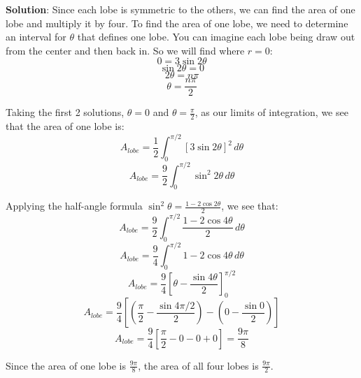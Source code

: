 \textbf{Solution}: Since each lobe is symmetric to the others, we can find the 
area of one lobe and multiply it by four. To find the area of one lobe, we 
need to determine an interval for $\theta$ that defines one lobe. You can 
imagine each lobe being draw out from the center and then back in. So we will 
find where $r = 0$:
$$0 = 3\sin{2\theta}$$
$$\sin{2\theta} = 0$$
$$2\theta = n\pi$$
$$\theta = \frac{n\pi}{2}$$

Taking the first 2 solutions, $\theta = 0$ and $\theta = \frac{\pi}{2}$, as our 
limits of integration, we see that the area of one lobe is:
$$A_{lobe} = \frac{1}{2} \int_0^{\pi/2} \left[3 \sin{2 \theta} \right]^2\,d
\theta$$
$$A_{lobe} = \frac{9}{2} \int_0^{\pi/2} \sin^2{2\theta}\,d\theta$$

Applying the half-angle formula $\sin^2{\theta} = \frac{1 - 2\cos{2\theta}}{2}$, 
we see that:
$$A_{lobe} = \frac{9}{2} \int_0^{\pi/2} \frac{1 - 2\cos{4\theta}}{2}\,d\theta$$
$$A_{lobe} = \frac{9}{4} \int_0^{\pi/2} 1 - 2\cos{4\theta}\,d\theta$$
$$A_{lobe} = \frac{9}{4} \left[ \theta - \frac{\sin{4\theta}}{2} \right]_{0}^{
\pi/2}$$
$$A_{lobe} = \frac{9}{4} \left[ \left( \frac{\pi}{2} - \frac{\sin{4\pi/2}}{2} 
\right) - \left(0 - \frac{\sin{0}}{2} \right) \right]$$
$$A_{lobe} = \frac{9}{4} \left[ \frac{\pi}{2} - 0 - 0 + 0 \right] = \frac{9
\pi}{8}$$

Since the area of one lobe is $\frac{9\pi}{8}$, the area of all four lobes is 
$\frac{9\pi}{2}$. 

